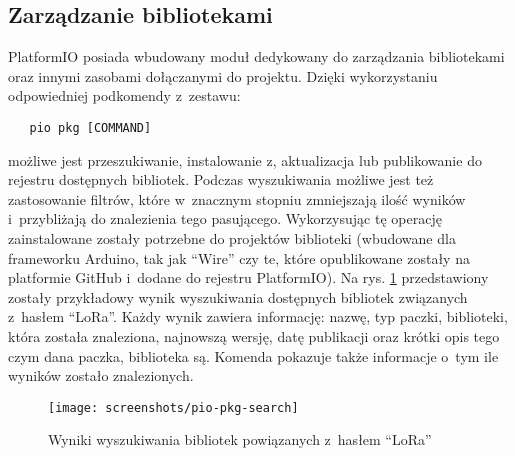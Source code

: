 \subsection{Zarządzanie bibliotekami\label{sect:pio-pkg}} PlatformIO posiada wbudowany moduł dedykowany do zarządzania
bibliotekami oraz innymi zasobami dołączanymi do projektu. Dzięki wykorzystaniu odpowiedniej podkomendy z~zestawu:
\begin{verbatim}
   pio pkg [COMMAND]
\end{verbatim}
możliwe jest przeszukiwanie, instalowanie z, aktualizacja lub publikowanie do rejestru dostępnych bibliotek. Podczas
wyszukiwania możliwe jest też zastosowanie filtrów, które w~znacznym stopniu zmniejszają ilość wyników i~przybliżają do
znalezienia tego pasującego. Wykorzysując tę operację zainstalowane zostały potrzebne do projektów biblioteki (wbudowane
dla frameworku Arduino, tak jak \enquote{Wire} czy te, które opublikowane zostały na platformie GitHub i~dodane do
rejestru PlatformIO). Na rys. \ref{img:pio-pkg-search} przedstawiony zostały przykładowy wynik wyszukiwania dostępnych
bibliotek związanych z~hasłem \enquote{LoRa}. Każdy wynik zawiera informację: nazwę, typ paczki, biblioteki, która
została znaleziona, najnowszą wersję, datę publikacji oraz krótki opis tego czym dana paczka, biblioteka są. Komenda
pokazuje także informacje o~tym ile wyników zostało znalezionych.

\begin{figure}[!htbp]
    \centering
    \texttt{[image: screenshots/pio-pkg-search]}
    \caption{\label{img:pio-pkg-search}Wyniki wyszukiwania bibliotek powiązanych z~hasłem \enquote{LoRa}}
\end{figure}